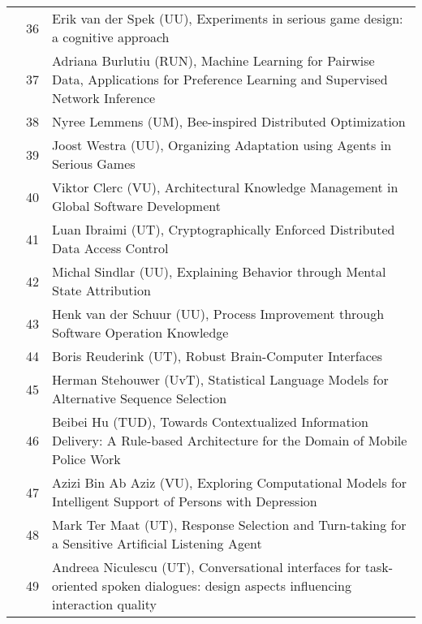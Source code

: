 \begin{longtabu}{@{}l@{ }l@{\hspace{1em}}X}
	&	 36	&	 Erik van der Spek (UU), Experiments in serious game design: a cognitive approach\\
	&	 37	&	 Adriana Burlutiu (RUN), Machine Learning for Pairwise Data, Applications for Preference Learning and Supervised Network Inference\\
	&	 38	&	 Nyree Lemmens (UM), Bee-inspired Distributed Optimization\\
	&	 39	&	 Joost Westra (UU), Organizing Adaptation using Agents in Serious Games\\
	&	 40	&	 Viktor Clerc (VU), Architectural Knowledge Management in Global Software Development\\
	&	 41	&	 Luan Ibraimi (UT), Cryptographically Enforced Distributed Data Access Control\\
	&	 42	&	 Michal Sindlar (UU), Explaining Behavior through Mental State Attribution\\
	&	 43	&	 Henk van der Schuur (UU), Process Improvement through Software Operation Knowledge\\
	&	 44	&	 Boris Reuderink (UT), Robust Brain-Computer Interfaces\\
	&	 45	&	 Herman Stehouwer (UvT), Statistical Language Models for Alternative Sequence Selection\\
	&	 46	&	 Beibei Hu (TUD), Towards Contextualized Information Delivery: A Rule-based Architecture for the Domain of Mobile Police Work\\
	&	 47	&	 Azizi Bin Ab Aziz (VU), Exploring Computational Models for Intelligent Support of Persons with Depression\\
	&	 48	&	 Mark Ter Maat (UT), Response Selection and Turn-taking for a Sensitive Artificial Listening Agent\\
	&	 49	&	 Andreea Niculescu (UT), Conversational interfaces for task-oriented spoken dialogues: design aspects influencing interaction quality\\


\end{longtabu}
